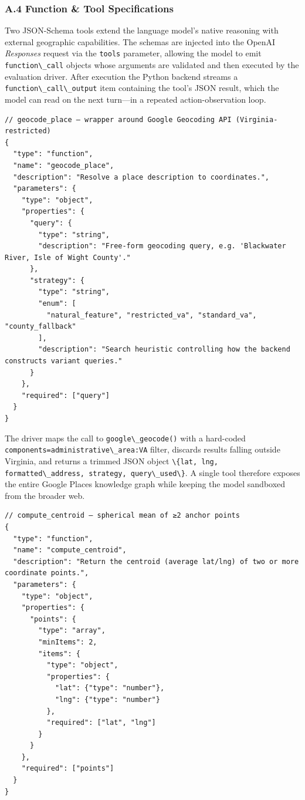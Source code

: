 \documentclass[
  10pt]{article}
\providecommand{\passthrough}[1]{#1}
\begin{document}
\subsubsection{A.4 Function \& Tool
Specifications}\label{a.4-function-tool-specifications}

Two JSON-Schema tools extend the language model's native reasoning with
external geographic capabilities. The schemas are injected into the
OpenAI \emph{Responses} request via the \passthrough{\lstinline!tools!}
parameter, allowing the model to emit
\passthrough{\lstinline!function\_call!} objects whose arguments are
validated and then executed by the evaluation driver. After execution
the Python backend streams a
\passthrough{\lstinline!function\_call\_output!} item containing the
tool's JSON result, which the model can read on the next turn---in a
repeated action-observation loop.

\begin{lstlisting}
// geocode_place – wrapper around Google Geocoding API (Virginia-restricted)
{
  "type": "function",
  "name": "geocode_place",
  "description": "Resolve a place description to coordinates.",
  "parameters": {
    "type": "object",
    "properties": {
      "query": {
        "type": "string",
        "description": "Free-form geocoding query, e.g. 'Blackwater River, Isle of Wight County'."
      },
      "strategy": {
        "type": "string",
        "enum": [
          "natural_feature", "restricted_va", "standard_va", "county_fallback"
        ],
        "description": "Search heuristic controlling how the backend constructs variant queries."
      }
    },
    "required": ["query"]
  }
}
\end{lstlisting}

The driver maps the call to \passthrough{\lstinline!google\_geocode()!}
with a hard-coded
\passthrough{\lstinline!components=administrative\_area:VA!} filter,
discards results falling outside Virginia, and returns a trimmed JSON
object
\passthrough{\lstinline!\{lat, lng, formatted\_address, strategy, query\_used\}!}.
A single tool therefore exposes the entire Google Places knowledge graph
while keeping the model sandboxed from the broader web.

\begin{lstlisting}
// compute_centroid – spherical mean of ≥2 anchor points
{
  "type": "function",
  "name": "compute_centroid",
  "description": "Return the centroid (average lat/lng) of two or more coordinate points.",
  "parameters": {
    "type": "object",
    "properties": {
      "points": {
        "type": "array",
        "minItems": 2,
        "items": {
          "type": "object",
          "properties": {
            "lat": {"type": "number"},
            "lng": {"type": "number"}
          },
          "required": ["lat", "lng"]
        }
      }
    },
    "required": ["points"]
  }
}
\end{lstlisting}
\end{document}
